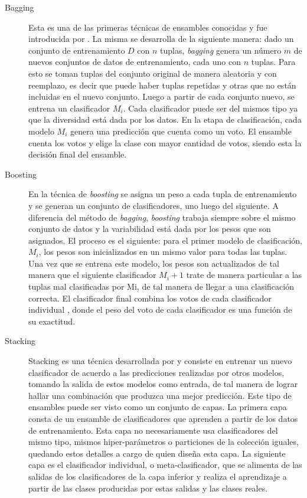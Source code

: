 \begin{description} 

   \item[Bagging] Esta es una de las primeras técnicas de ensambles conocidas y
      fue introducida por
      \citeauthor{breiman_bagging_1996}\cite{breiman_bagging_1996}. La misma se
      desarrolla de la siguiente manera: dado un conjunto de entrenamiento $D$
      con $n$  tuplas, \textit{bagging} genera un número $m$ de nuevos conjuntos
      de datos de entrenamiento, cada uno con $n$ tuplas. Para esto se toman
      tuplas del conjunto original de manera aleatoria y con reemplazo, es decir
      que puede haber tuplas repetidas y otras que no están incluidas en el
      nuevo conjunto.  Luego a partir de cada conjunto nuevo, se entrena un
      clasificador $M_{i}$. Cada clasificador puede ser del mismos tipo ya que
      la diversidad está dada por los datos. En la etapa de clasificación, cada
      modelo $M_{i}$ genera una predicción que cuenta como un voto. El ensamble
      cuenta los votos y elige la clase con mayor cantidad de votos, siendo esta
      la decisión final del ensamble.


   \item[Boosting] En la técnica de \textit{boosting} se asigna un peso a cada
      tupla de entrenamiento y se generan un conjunto de clasificadores, uno
      luego del siguiente. A diferencia del método de \textit{bagging},
      \textit{boosting} trabaja siempre sobre el mismo conjunto de datos y la
      variabilidad está dada por los pesos que son asignados. El proceso es el
      siguiente: para el primer modelo de clasificación, $M_{i}$, los pesos son
      inicializados en un mismo valor para todas las tuplas. Una vez que se
      entrena este modelo, los pesos son actualizados de tal manera que el
      siguiente clasificador $M_{i} + 1$ trate de manera particular a las tuplas
      mal clasificadas por Mi, de tal manera de llegar a una clasificación
      correcta.  El clasificador final combina los votos de cada clasificador
      individual , donde el peso del voto de cada clasificador es una función de
      su exactitud. 


   \item[Stacking] Stacking es una técnica desarrollada por
      \citeauthor{wolpert_stacked_1992}\cite{wolpert_stacked_1992} y consiste en
      entrenar un nuevo clasificador de acuerdo a las predicciones realizadas
      por otros modelos, tomando la salida de estos modelos como entrada, de tal
      manera de lograr hallar una combinación que produzca una mejor predicción.
      Este tipo de ensambles puede ser visto como un conjunto de capas. La
      primera capa consta de un ensamble de clasificadores que aprenden a partir
      de los datos de entrenamiento. Esta capa no necesariamente usa
      clasificadores del mismo tipo, mismos hiper-parámetros o particiones de la
      colección iguales, quedando estos detalles a cargo de quien diseña esta
      capa. La siguiente capa es el clasificador individual, o
      meta-clasificador, que se alimenta de las salidas de los clasificadores de
      la capa inferior y realiza el aprendizaje a partir de las clases
      producidas por estas salidas y las clases reales.


\end{description}
